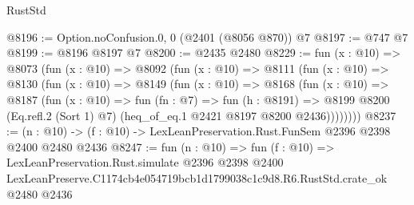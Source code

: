 \begin{lexlean}{RustStd}
\begin{coremodule}
@8196 := Option.noConfusion.{0, 0} (@2401 (@8056 @870)) @7
@8197 := @747 @7
@8199 := @8196 @8197 @7
@8200 := @2435 @2480
@8229 := fun (x : @10) =>
  @8073
    (fun (x : @10) =>
    @8092
      (fun (x : @10) =>
      @8111
        (fun (x : @10) =>
        @8130
          (fun (x : @10) =>
          @8149
            (fun (x : @10) =>
            @8168
              (fun (x : @10) =>
              @8187
                (fun (x : @10) =>
                fun (fn : @7) =>
                fun (h : @8191) =>
                @8199 @8200 (Eq.refl.{2} (Sort 1) @7) (heq_of_eq.{1} @2421 @8197 @8200 @2436))))))))
@8237 := (n : @10) -> (f : @10) -> LexLeanPreservation.Rust.FunSem @2396 @2398 @2400 @2480 @2436
@8247 := fun (n : @10) =>
  fun (f : @10) =>
  LexLeanPreservation.Rust.simulate
    @2396
    @2398
    @2400
    LexLeanPreserve.C1174cb4e054719bcb1d1799038c1c9d8.R6.RustStd.crate_ok
    @2480
    @2436
\end{coremodule}
\end{lexlean}
